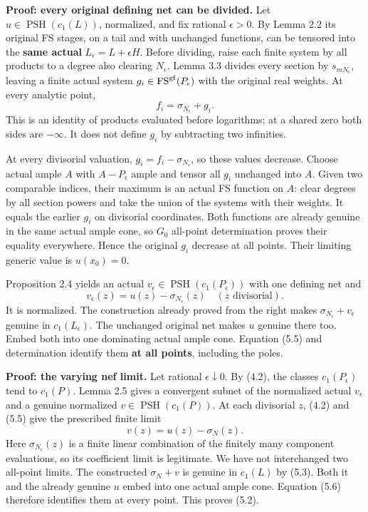 \documentclass[
  10pt,
]{article}
\begin{document}
\textbf{Proof: every original defining net can be divided.} Let
\(u\in\operatorname{PSH}(c_1(L))\), normalized, and fix rational
\(\epsilon>0\). By Lemma 2.2 its original FS stages, on a tail and with
unchanged functions, can be tensored into the \textbf{same actual}
\(L_\epsilon=L+\epsilon H\). Before dividing, raise each finite system
by all products to a degree also clearing \(N_\epsilon\). Lemma 3.3
divides every section by \(s_{mN_\epsilon}\), leaving a finite actual
system \(g_i\in\operatorname{FS}^{\rm gf}(P_\epsilon)\) with the
original real weights. At every analytic point, \[
 f_i=\sigma_{N_\epsilon}+g_i.                                  \tag{5.4}
\] This is an identity of products evaluated before logarithms; at a
shared zero both sides are \(-\infty\). It does not define \(g_i\) by
subtracting two infinities.

At every divisorial valuation, \(g_i=f_i-\sigma_{N_\epsilon}\), so these
values decrease. Choose actual ample \(A\) with \(A-P_\epsilon\) ample
and tensor all \(g_i\) unchanged into \(A\). Given two comparable
indices, their maximum is an actual FS function on \(A\): clear degrees
by all section powers and take the union of the systems with their
weights. It equals the earlier \(g_i\) on divisorial coordinates. Both
functions are already genuine in the same actual ample cone, so \(G_0\)
all-point determination proves their equality everywhere. Hence the
original \(g_i\) decrease at all points. Their limiting generic value is
\(u(x_0)=0\).

Proposition 2.4 yields an actual
\(v_\epsilon\in\operatorname{PSH}(c_1(P_\epsilon))\) with one defining
net and \[
 v_\epsilon(z)=u(z)-\sigma_{N_\epsilon}(z)
                     \quad(z\text{ divisorial}).               \tag{5.5}
\] It is normalized. The construction already proved from the right
makes \(\sigma_{N_\epsilon}+v_\epsilon\) genuine in \(c_1(L_\epsilon)\).
The unchanged original net makes \(u\) genuine there too. Embed both
into one dominating actual ample cone. Equation (5.5) and determination
identify them \textbf{at all points}, including the poles.

\textbf{Proof: the varying nef limit.} Let rational
\(\epsilon\downarrow0\). By (4.2), the classes \(c_1(P_\epsilon)\) tend
to \(c_1(P)\). Lemma 2.5 gives a convergent subnet of the normalized
actual \(v_\epsilon\) and a genuine normalized
\(v\in\operatorname{PSH}(c_1(P))\). At each divisorial \(z\), (4.2) and
(5.5) give the prescribed finite limit \[
 v(z)=u(z)-\sigma_N(z).                                         \tag{5.6}
\] Here \(\sigma_{N_\epsilon}(z)\) is a finite linear combination of the
finitely many component evaluations, so its coefficient limit is
legitimate. We have not interchanged two all-point limits. The
constructed \(\sigma_N+v\) is genuine in \(c_1(L)\) by (5.3). Both it
and the already genuine \(u\) embed into one actual ample cone. Equation
(5.6) therefore identifies them at every point. This proves (5.2).
\end{document}
